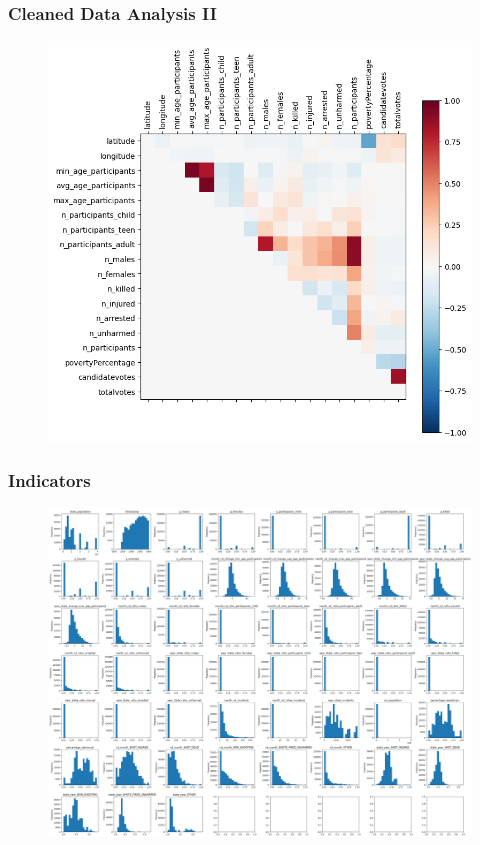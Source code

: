 

\begin{frame}
    \frametitle{Cleaned Data Analysis II}
    \begin{figure}
        \centering
        \includegraphics[width=.75\textwidth]{img/DU/corrScaled.png}
        \label{corr}
    \end{figure}
\end{frame}


\begin{frame}
    \frametitle{Indicators}
    \begin{figure}
        \centering
        \includegraphics[width=.8\textwidth]{img/DU/distInd.png}
        \label{corr}
    \end{figure}
\end{frame}
